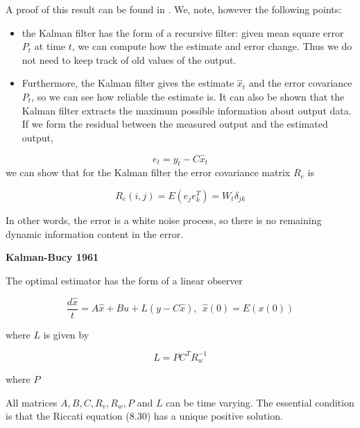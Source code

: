 A proof of this result can be found in \cite{Astrom}. We, note, however the following points:

\begin{itemize}
\item the Kalman filter has the form of a recursive filter: given mean square error $P_t$ at time $t$, we can compute how the estimate and error change. Thus we do not need to keep track of old values of the output.
\item Furthermore, the Kalman filter gives the estimate $\hat{x}_t$ and the error covariance $P_t$, so we can see how reliable the estimate is. 
It can also be shown that the Kalman filter extracts the maximum possible information about output data. 
If we form the residual between the measured output and the estimated output,
\end{itemize}

\begin{equation}
e_t = y_t - C\hat{x}_t
\end{equation}
we can show that for the Kalman filter the error covariance matrix $R_e$ is

\begin{equation}
R_e(i,j) = E(e_{j}e_{k}^{T}) = W_t\delta_{jk} 
\end{equation}

In other words, the error is a white noise process, so there is no remaining dynamic information content in the error.




\begin{framed}
\theoremstyle{theorem}
\begin{theorem}{\textbf{Kalman-Bucy 1961}}


The optimal estimator has the form of a linear observer 

\begin{equation}
\frac{d\hat{x}}{t} = A\hat{x} + Bu + L(y - C\hat{x}),  ~~ \hat{x}(0) = E(x(0)) \nonumber
\end{equation} 

where $L$ is given by

\begin{equation}
L = PC^TR_{w}^{-1}  \nonumber
\end{equation}

where $P$


\end{theorem}
\end{framed}


All matrices $A, B, C, R_v, R_w, P$ and $L$ can be time varying. The essential condition is that the Riccati equation (8.30) has a unique positive 
solution.

